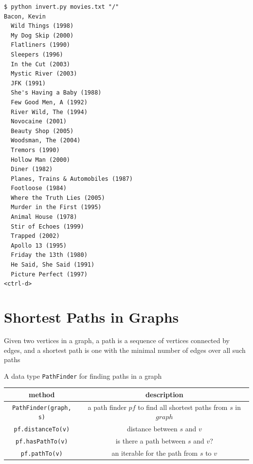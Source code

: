 \documentclass[8pt,a4paper,compress]{beamer}
\begin{document}
\begin{frame}[fragile]
\pause

\begin{lstlisting}[language={}]
$ python invert.py movies.txt "/"
Bacon, Kevin
  Wild Things (1998)
  My Dog Skip (2000)
  Flatliners (1990)
  Sleepers (1996)
  In the Cut (2003)
  Mystic River (2003)
  JFK (1991)
  She's Having a Baby (1988)
  Few Good Men, A (1992)
  River Wild, The (1994)
  Novocaine (2001)
  Beauty Shop (2005)
  Woodsman, The (2004)
  Tremors (1990)
  Hollow Man (2000)
  Diner (1982)
  Planes, Trains & Automobiles (1987)
  Footloose (1984)
  Where the Truth Lies (2005)
  Murder in the First (1995)
  Animal House (1978)
  Stir of Echoes (1999)
  Trapped (2002)
  Apollo 13 (1995)
  Friday the 13th (1980)
  He Said, She Said (1991)
  Picture Perfect (1997)
<ctrl-d>
\end{lstlisting}
\end{frame}

\section{Shortest Paths in Graphs}
\begin{frame}[fragile]
\pause

Given two vertices in a graph, a path is a sequence of vertices connected by edges, and a shortest path is one with the minimal number of edges over all such paths

\pause
\bigskip

A data type \lstinline{PathFinder} for finding paths in a graph
\begin{center}
\begin{tabular}{cc}
method & description \\ \hline
\lstinline$PathFinder(graph, s)$ & a path finder $pf$ to find all shortest paths from $s$ in $graph$ \\
\lstinline$pf.distanceTo(v)$ & distance between $s$ and $v$ \\
\lstinline$pf.hasPathTo(v)$ & is there a path between $s$ and $v$? \\
\lstinline$pf.pathTo(v)$ & an iterable for the path from $s$ to $v$
\end{tabular} 
\end{center}
\end{frame}
\end{document}
